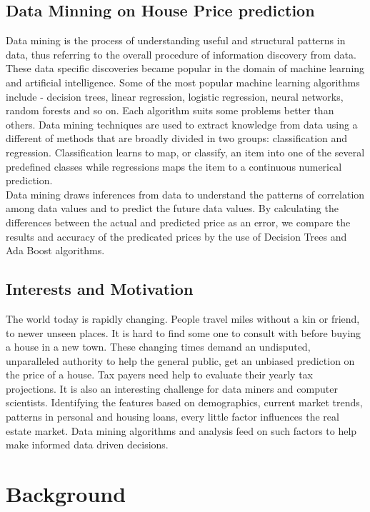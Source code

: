\documentclass[fleqn,10pt]{SelfArx} %
\begin{document}
	\subsection{Data Minning on House Price prediction}
	Data mining is the process of understanding useful and structural patterns in data, thus referring to the overall procedure of information discovery from data. These data specific discoveries became popular in the domain of machine learning and artificial intelligence. Some of the most popular machine learning algorithms include - decision trees, linear regression, logistic regression, neural networks, random forests and so on. Each algorithm suits some problems better than others. Data mining techniques are used to extract knowledge from data using a different of methods that are broadly divided in two groups: classification and regression. Classification learns to map, or classify, an item into one of the several predefined classes while regressions maps the item to a continuous numerical prediction.\\
	
	Data mining draws inferences from data to understand the patterns of correlation among data values and to predict the future data values. By calculating the differences between the actual and predicted price as an error, we compare the results and accuracy of the predicated prices by the use of Decision Trees and Ada Boost algorithms. 
	
	\subsection{Interests and Motivation}
	The world today is rapidly changing. People travel miles without a kin or friend, to newer unseen places. It is hard to find some one to consult with before buying a house in a new town. These changing times demand an undisputed, unparalleled authority to help the general public, get an unbiased prediction on the price of a house. Tax payers need help to evaluate their yearly tax projections. It is also an interesting challenge for data miners and computer scientists. Identifying the features based on demographics, current market trends, patterns in personal and housing loans, every little factor influences the real estate market. Data mining algorithms and analysis feed on such factors to help make informed data driven decisions. 

	
	
	\section{Background}
	
\end{document}

